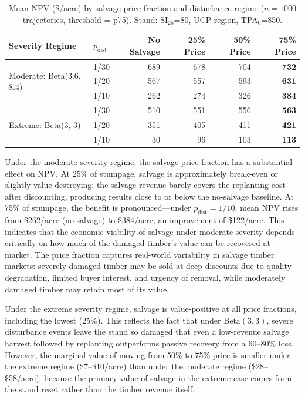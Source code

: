 \documentclass[12pt]{report}
\begin{document}
\begin{table}[htbp]
  \centering
  \caption{Mean NPV (\$/acre) by salvage price fraction and disturbance regime ($n=1000$ trajectories, threshold = p75). Stand: SI$_{25}$=80, UCP region, TPA$_0$=850.}
  \label{tab:salvage-price}
  \small
  \begin{tabular}{llrrrr}
  \toprule
  Severity Regime & $p_{\text{dist}}$ & No Salvage & 25\% Price & 50\% Price & 75\% Price \\
  \midrule
  \multirow{3}{*}{Moderate: Beta(3.6, 8.4)}
    & 1/30 & 689 & 678 & 704 & \textbf{732} \\
    & 1/20 & 567 & 557 & 593 & \textbf{631} \\
    & 1/10 & 262 & 274 & 326 & \textbf{384} \\
  \midrule
  \multirow{3}{*}{Extreme: Beta(3, 3)}
    & 1/30 & 510 & 551 & 556 & \textbf{563} \\
    & 1/20 & 351 & 405 & 411 & \textbf{421} \\
    & 1/10 &  30 &  96 & 103 & \textbf{113} \\
  \bottomrule
  \end{tabular}
\end{table}

Under the moderate severity regime, the salvage price fraction has a substantial effect on NPV. At 25\% of stumpage, salvage is approximately break-even or slightly value-destroying: the salvage revenue barely covers the replanting cost after discounting, producing results close to or below the no-salvage baseline. At 75\% of stumpage, the benefit is pronounced---under $p_{\text{dist}} = 1/10$, mean NPV rises from \$262/acre (no salvage) to \$384/acre, an improvement of \$122/acre. This indicates that the economic viability of salvage under moderate severity depends critically on how much of the damaged timber's value can be recovered at market. The price fraction captures real-world variability in salvage timber markets: severely damaged timber may be sold at deep discounts due to quality degradation, limited buyer interest, and urgency of removal, while moderately damaged timber may retain most of its value.

Under the extreme severity regime, salvage is value-positive at all price fractions, including the lowest (25\%). This reflects the fact that under $\text{Beta}(3, 3)$, severe disturbance events leave the stand so damaged that even a low-revenue salvage harvest followed by replanting outperforms passive recovery from a 60--80\% loss. However, the marginal value of moving from 50\% to 75\% price is smaller under the extreme regime (\$7--\$10/acre) than under the moderate regime (\$28--\$58/acre), because the primary value of salvage in the extreme case comes from the stand reset rather than the timber revenue itself.
\end{document}
